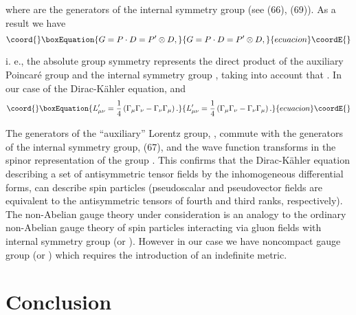 \documentclass[a4paper,12pt]{article}
\begin{document}
where \coordHE{} are the generators of the internal symmetry
group \coordHE{} (see (66), (69)). As a result we have
\begin{equation}\coord{}\boxEquation{
G=P\cdot D=P^{\prime }\otimes D  ,\label{135}
}{
G=P\cdot D=P^{\prime }\otimes D  ,}{ecuacion}\coordE{}\end{equation}

i. e., the absolute group symmetry \coordHE{} represents the direct
product of the auxiliary Poincar\'e group \coordHE{} and the
internal symmetry group \coordHE{} , taking into account that \coordHE{}. In our case of the Dirac-K\"ahler equation, \coordHE{} and
\begin{equation}\coord{}\boxEquation{
L_{\mu \nu }^{\prime }=\frac 14\left( \Gamma _\mu \Gamma _\nu
-\Gamma _\nu \Gamma _\mu \right) . \label{136}
}{
L_{\mu \nu }^{\prime }=\frac 14\left( \Gamma _\mu \Gamma _\nu
-\Gamma _\nu \Gamma _\mu \right) . }{ecuacion}\coordE{}\end{equation}

The generators of the ``auxiliary'' Lorentz group, \coordHE{}, commute with the generators of the internal symmetry
group, \coordHE{} (67), and the wave function transforms in the
spinor representation of the group \coordHE{}. This confirms that the Dirac-K\"ahler equation
describing a set of antisymmetric tensor fields by the
inhomogeneous differential forms, can describe spin \coordHE{}
particles (pseudoscalar and pseudovector fields are equivalent to
the antisymmetric tensors of fourth and third ranks,
respectively). The non-Abelian gauge theory under consideration is
an analogy to the ordinary non-Abelian gauge theory of spin \coordHE{}
particles interacting via gluon fields with internal symmetry
group \coordHE{} (or \coordHE{}). However in our case we have noncompact
gauge group \coordHE{} (or \coordHE{}) which requires the
introduction of an indefinite metric.

\section{Conclusion}
\end{document}

